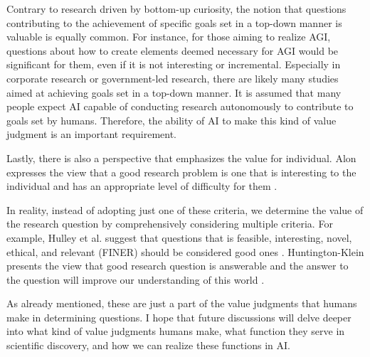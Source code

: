 Contrary to research driven by bottom-up curiosity, the notion that questions contributing to the achievement of specific goals set in a top-down manner is valuable is equally common. For instance, for those aiming to realize AGI, questions about how to create elements deemed necessary for AGI would be significant for them, even if it is not interesting or incremental. Especially in corporate research or government-led research, there are likely many studies aimed at achieving goals set in a top-down manner. It is assumed that many people expect AI capable of conducting research autonomously to contribute to goals set by humans. Therefore, the ability of AI to make this kind of value judgment is an important requirement.

Lastly, there is also a perspective that emphasizes the value for individual. Alon expresses the view that a good research problem is one that is interesting to the individual and has an appropriate level of difficulty for them \cite{alon2009choose}.

In reality, instead of adopting just one of these criteria, we determine the value of the research question by comprehensively considering multiple criteria. For example, Hulley et al. suggest that questions that is feasible, interesting, novel, ethical, and relevant (FINER) should be considered good ones \cite{hulley2007designing}. Huntington-Klein presents the view that good research question is answerable and the answer to the question will improve our understanding of this world \cite{huntington2021effect}.

As already mentioned, these are just a part of the value judgments that humans make in determining questions. I hope that future discussions will delve deeper into what kind of value judgments humans make, what function they serve in scientific discovery, and how we can realize these functions in AI.



